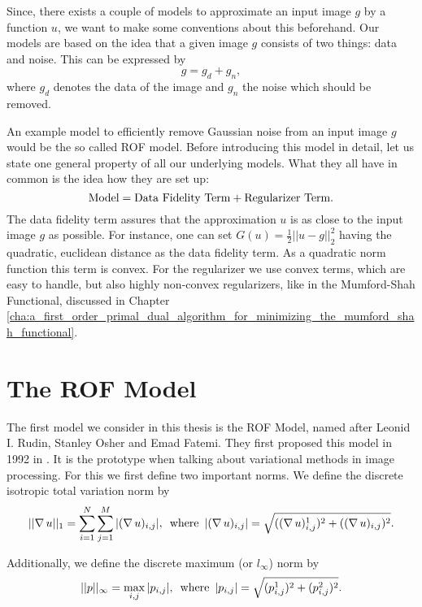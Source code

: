 Since, there exists a couple of models to approximate an input image $g$ by a function $u$, we want to make some conventions about this beforehand. Our models are based on the idea that a given image $g$ consists of two things: data and noise. This can be expressed by
    $$
        g = g_{d} + g_{n},
    $$
where $g_{d}$ denotes the data of the image and $g_{n}$ the noise which should be removed.

An example model to efficiently remove Gaussian noise from an input image $g$ would be the so called ROF model. Before introducing this model in detail, let us state one general property of all our underlying models. What they all have in common is the idea how they are set up:
    $$
        \textnormal{Model} = \textnormal{Data Fidelity Term} + \textnormal{Regularizer Term}.
    $$
The data fidelity term assures that the approximation $u$ is as close to the input image $g$ as possible. For instance, one can set $G(u) = \frac{1}{2} ||u - g||_{2}^{2}$ having the quadratic, euclidean distance as the data fidelity term. As a quadratic norm function this term is convex. For the regularizer we use convex terms, which are easy to handle, but also highly non-convex regularizers, like in the Mumford-Shah Functional, discussed in Chapter \ref{cha:a_first_order_primal_dual_algorithm_for_minimizing_the_mumford_shah_functional}.

\section{The ROF Model} %
\label{sec:the_rof_model}
    
    The first model we consider in this thesis is the ROF Model, named after Leonid I. Rudin, Stanley Osher and Emad Fatemi. They first proposed this model in 1992 in \cite{ROF}. It is the prototype when talking about variational methods in image processing. For this we first define two important norms. We define the discrete isotropic total variation norm by
        \begin{equation}
            ||\nabla \, u||_{1} = \sum_{i = 1}^{N} \sum_{j = 1}^{M} |(\nabla \, u)_{i, j}|, \,\,\, \textnormal{where} \,\,\, |(\nabla \, u)_{i, j}| = \sqrt{((\nabla \, u)^{1}_{i, j})^{2} + ((\nabla \, u)_{i, j})^{2}}.
        \label{eq:isotropic_total_variation_norm}
        \end{equation}

    Additionally, we define the discrete maximum (or $l_{\infty}$) norm by
        \begin{equation}
            ||p||_{\infty} = \max_{i, j} |p_{i, j}|, \,\,\, \textnormal{where} \,\,\, |p_{i, j}| = \sqrt{(p^{1}_{i, j})^{2} + (p^{2}_{i, j})^{2}}.
        \end{equation}

